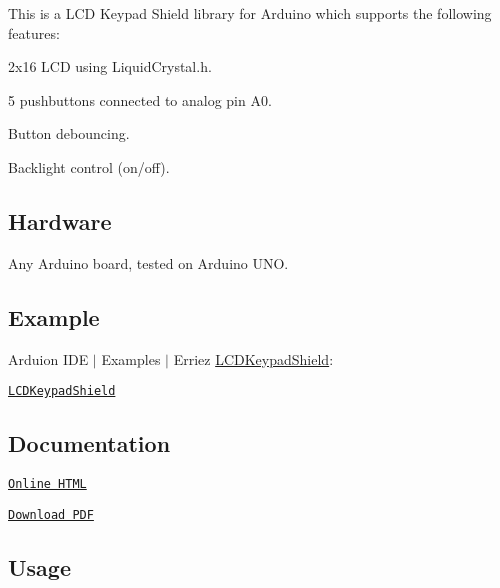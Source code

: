 \href{https://travis-ci.org/Erriez/ErriezLCDKeypadShield}{\tt }

This is a L\+CD Keypad Shield library for Arduino which supports the following features\+:


\begin{DoxyItemize}
\item 2x16 L\+CD using {\ttfamily Liquid\+Crystal.\+h}.
\item 5 pushbuttons connected to analog pin A0.
\item Button debouncing.
\item Backlight control (on/off).
\end{DoxyItemize}

\subsection*{Hardware}

Any Arduino board, tested on Arduino U\+NO.



\subsection*{Example}

Arduion I\+DE $\vert$ Examples $\vert$ Erriez \hyperlink{class_l_c_d_keypad_shield}{L\+C\+D\+Keypad\+Shield}\+:


\begin{DoxyItemize}
\item \href{https://github.com/Erriez/ErriezLCDKeypadShield/blob/master/examples/LCDKeypadShield/LCDKeypadShield.ino}{\tt L\+C\+D\+Keypad\+Shield}
\end{DoxyItemize}

\subsection*{Documentation}


\begin{DoxyItemize}
\item \href{https://Erriez.github.io/ErriezLCDKeypadShield}{\tt Online H\+T\+ML}
\item \href{https://github.com/Erriez/ErriezLCDKeypadShield/raw/gh-pages/latex/ErriezLCDKeypadShield.pdf}{\tt Download P\+DF}
\end{DoxyItemize}

\subsection*{Usage}

